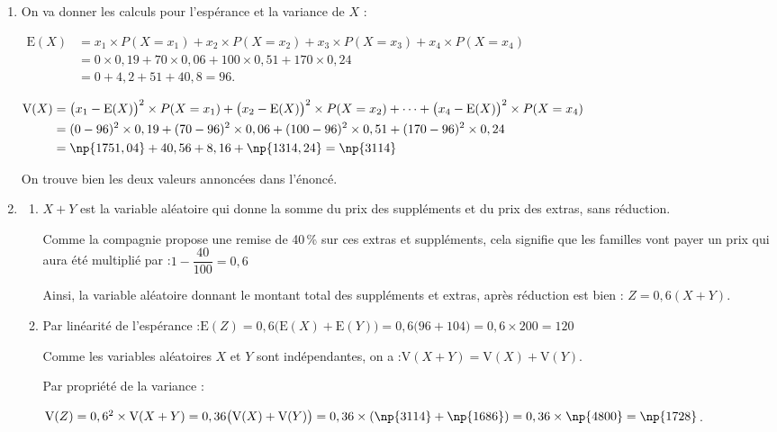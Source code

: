 	\begin{enumerate}
		\item On va donner les calculs pour l'espérance et la variance de $X$ :

		$\begin{aligned}
			\mathrm{E}(X)&= x_1 \times P(X = x_1) +x_2 \times P(X = x_2) +x_3 \times P(X = x_3) +x_4 \times P(X = x_4)\\
				&=0 \times 0,19 + 70 \times 0,06 + 100 \times 0,51 + 170  \times 0,24\\
				&= 0 + 4,2 + 51 + 40,8 = 96.
		\end{aligned}$

		$\begin{aligned}
			\mathrm{V}(X) & = \big(x_1-\mathrm{E}(X)\big)^2  \times P(X = x_1) + \big(x_2-\mathrm{E}(X)\big)^2 \times P(X = x_2) + \dots 
			 + \big(x_4-\mathrm{E}(X)\big)^2 \times P(X = x_4)\\
			&=(0 - 96)^2 \times 0,19 + (70-96)^2 \times 0,06 + (100 - 96)^2 \times 0,51 + (170-96)^2  \times 0,24\\
			&= \np{1751,04} + 40,56 + 8,16 + \np{1314,24}=\np{3114}
		\end{aligned}$

		On trouve bien les deux valeurs annoncées dans l'énoncé.

		\item \begin{enumerate}
			\item $X + Y$ est la variable aléatoire qui donne la somme du prix des suppléments et du prix des extras, sans réduction.

			Comme la compagnie propose une remise de 40\,\% sur ces extras et suppléments, cela signifie que les familles vont payer un prix qui aura été multiplié par :\quad $1 - \dfrac{40}{100} = 0,6$

			Ainsi, la variable aléatoire donnant le montant total des suppléments et extras, après réduction est bien : \quad $Z = 0,6(X + Y)$.

			\item Par linéarité de l'espérance :\quad $\mathrm{E}(Z)= 0,6 \big(\mathrm{E}(X) + \mathrm{E}(Y)\big) = 0,6\big(96 + 104\big) = 0,6 \times 200 = 120$

			Comme les variables aléatoires $X$ et $Y$ sont indépendantes, on a :\quad $\mathrm{V}(X + Y) = \mathrm{V}(X) + \mathrm{V}(Y)$.

			Par propriété de la variance :

			$\mathrm{V}(Z)=0,6^2 \times \mathrm{V}(X + Y) = 0,36\big(\mathrm{V}(X) + \mathrm{V}(Y)\big) = 0,36 \times (\np{3114} + \np{1686}) = 0,36 \times \np{4800} = \np{1728}$.
		\end{enumerate}


\end{enumerate}
